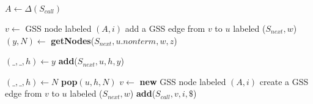 \begin{algorithmic}    
    \State $A \gets \Delta(S_{call})$
    
        \State $v \gets$ GSS node labeled $(A, i)$
            \State add a GSS edge from $v$ to $u$ labeled ($S_{next},w$)
                \State $(y,N) \gets$ \textbf{getNodes}($S_{next}, u.nonterm, w, z$)
                
                \State $(\_, \_, h) \gets y$
                \State \textbf{add}($S_{next} , u, h, y$)
                
                    \State $(\_, \_, h) \gets N$
                    \State \textbf{pop}$(u,h,N)$ 
                \EndIf
            \EndFor
        \EndIf
    \Else
        \State $v \gets$ \textbf{new} GSS node labeled $(A, i)$
        \State create a GSS edge from $v$ to $u$ labeled ($S_{next}, w$)
        \State \textbf{add}($S_{call}, v, i, \$ $)
    \EndIf
\EndFunction
\end{algorithmic}  